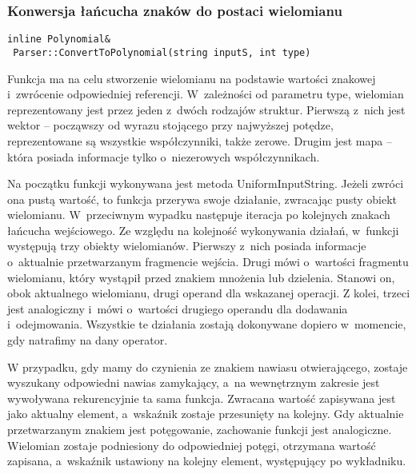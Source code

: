 \subsubsection{Konwersja łańcucha znaków do postaci wielomianu}
\begin{lstlisting}
inline Polynomial&
 Parser::ConvertToPolynomial(string inputS, int type)
\end{lstlisting}

Funkcja ma na celu stworzenie wielomianu na podstawie wartości znakowej i~zwrócenie odpowiedniej referencji. W~zależności od parametru type, wielomian reprezentowany jest przez jeden z~dwóch rodzajów struktur. Pierwszą z~nich jest wektor -- począwszy od wyrazu stojącego przy najwyższej potędze, reprezentowane są wszystkie współczynniki, także zerowe. Drugim jest mapa -- która posiada informacje tylko o~niezerowych współczynnikach.

Na początku funkcji wykonywana jest metoda UniformInputString. Jeżeli zwróci ona pustą wartość, to funkcja przerywa swoje działanie, zwracając pusty obiekt wielomianu. W~przeciwnym wypadku następuje iteracja po kolejnych znakach łańcucha wejściowego. Ze względu na kolejność wykonywania działań, w~funkcji występują trzy obiekty wielomianów. Pierwszy z~nich posiada informacje o~aktualnie przetwarzanym fragmencie wejścia. Drugi mówi o~wartości fragmentu wielomianu, który wystąpił przed znakiem mnożenia lub dzielenia. Stanowi on, obok aktualnego wielomianu, drugi operand dla wskazanej operacji. Z kolei, trzeci jest analogiczny i~mówi o~wartości drugiego operandu dla dodawania i~odejmowania. Wszystkie te działania zostają dokonywane dopiero w~momencie, gdy natrafimy na dany operator.

W przypadku, gdy mamy do czynienia ze znakiem nawiasu otwierającego, zostaje wyszukany odpowiedni nawias zamykający, a~na wewnętrznym zakresie jest wywoływana rekurencyjnie ta sama funkcja. Zwracana wartość zapisywana jest jako aktualny element, a~wskaźnik zostaje przesunięty na kolejny. Gdy aktualnie przetwarzanym znakiem jest potęgowanie, zachowanie funkcji jest analogiczne. Wielomian zostaje podniesiony do odpowiedniej potęgi, otrzymana wartość zapisana, a~wskaźnik ustawiony na kolejny element, występujący po wykładniku.

